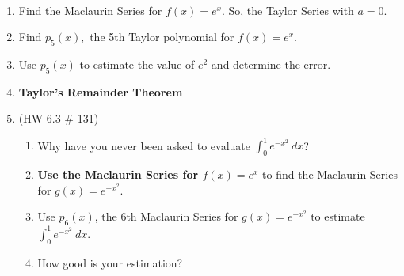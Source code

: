 \documentclass[11pt]{amsart}
\begin{document}
\begin{center}
  \large
  \\
   
\end{center}

\begin{enumerate}
\item Find the Maclaurin Series for $f(x)=e^x.$ So, the Taylor Series with $a=0.$
\vfill
\item Find $p_5(x),$ the 5th Taylor polynomial for $f(x)=e^x.$
\vspace{1in}
\item Use $p_5(x)$ to estimate the value of $e^2$ and determine the error.
\vfill
\item \textbf{Taylor's Remainder Theorem}
\vfill
\newpage
\item (HW 6.3 \# 131) 
	\begin{enumerate}
	\item Why have you never been asked to evaluate $\displaystyle \int_0^1 e^{-x^2} \: dx$?
	\vfill
	\item \textbf{Use the Maclaurin Series for $f(x)=e^x$} to find the Maclaurin Series for $g(x)=e^{-x^2}.$
	\vfill
	\item Use $p_6(x)$, the 6th Maclaurin Series for $g(x)=e^{-x^2}$ to estimate $\displaystyle \int_0^1 e^{-x^2} \: dx.$
	\vfill
	\item How good is your estimation?
	\vfill
	\end{enumerate}
\end{enumerate}
\end{document}
